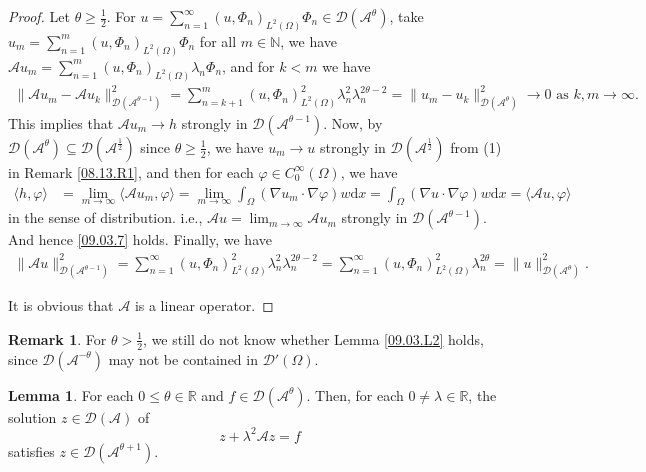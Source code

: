 \documentclass[preprint,12pt]{elsarticle}
\theoremstyle{definition}   %
\newtheorem{lemma}[theorem]{Lemma}
\newtheorem{remark}[theorem]{Remark}
\numberwithin{equation}{section}
\def\ra{\rightarrow}
\def\s{\subseteq}
\def\ms{\mathscr}
\def\vp{\varphi}
\def\lg{\langle}
\def\rg{\rangle}
\def\Om{\Omega}
\def\la{\lambda}
\def\iy{\infty}
\def\f{\frac}
\def\df{\mathrm d}
\def\mcA{\mathcal{A}}
\def\mcD{\mathcal{D}}
\newcommand{\R}{\mathbb R}
\newcommand{\N}{\mathbb N}
\begin{document}
\begin{proof}
	Let $\theta\geq \f{1}{2}$. For $u=\sum_{n=1}^\iy (u, \Phi_n)_{L^2(\Om)}\Phi_n\in \mcD(\mcA^\theta)$, take $u_m=\sum_{n=1}^m (u,\Phi_n)_{L^2(\Om)}\Phi_n$ for all $m\in\N$,   we have $\mcA u_m=\sum_{n=1}^m (u,\Phi_n)_{L^2(\Om)}\la_n \Phi_n$, and for $k< m$ we have 
	\begin{equation*}
		\begin{split} 
			\|\mcA u_m-\mcA u_k\|_{\mcD(\mcA^{\theta-1})}^2=\sum_{n=k+1}^m(u,\Phi_n)_{L^2(\Om)}^2\la_n^2 \la_n^{2\theta-2}= \|u_m-u_k\|_{\mcD(\mcA^\theta)}^2\ra 0 \mbox{ as } k,m\ra \iy. 
		\end{split} 
	\end{equation*}
	This implies that $\mcA u_m\ra h$ strongly in $\mcD(\mcA^{\theta-1})$. Now,  by $\mcD(\mcA^\theta)\s \mcD(\mcA^\f{1}{2})$ since $\theta\geq \f{1}{2}$, we have $u_m\ra u$ strongly in $\mcD(\mcA^\f{1}{2})$ from (1) in Remark \ref{08.13.R1}, and then  for each $\vp\in C_0^\iy(\Om)$, we have 
	\begin{equation*}
		\begin{split}
			\lg h, \vp\rg
			&=\lim_{m\ra\iy}\lg \mcA u_m, \vp\rg=\lim_{m\ra\iy}\int_\Om (\nabla u_m\cdot \nabla \vp)w\df x=\int_\Om (\nabla u\cdot\nabla\vp)w\df x=\lg \mcA u, \vp\rg 
		\end{split}
	\end{equation*}
	in the sense of distribution.  i.e., $\mcA u=\lim_{m\ra\iy}\mcA u_m$ strongly in $\mcD(\mcA^{\theta-1})$. And hence \eqref{09.03.7} holds. Finally, we have 
	\begin{equation*}
		\begin{split}
			\|\mcA u\|_{\mcD(\mcA^{\theta-1})}^2=\sum_{n=1}^\iy (u,\Phi_n)_{L^2(\Om)}^2\la_n^2\la_n^{2\theta-2}=\sum_{n=1}^\iy (u,\Phi_n)_{L^2(\Om)}^2\la_n^{2\theta}=\|u\|_{\mcD(\mcA^\theta)}^2. 
		\end{split}
	\end{equation*}
	
	
	It is obvious that $\mcA$ is a linear operator. 
\end{proof}

\begin{remark}\label{09.03.R1}
	For $\theta > \frac{1}{2}$, we still do not know whether Lemma \ref{09.03.L2} holds, since $\mathcal{D}(\mathcal{A}^{-\theta})$ may not be contained in $\ms{D}'(\Omega)$.
\end{remark}



\begin{lemma}\label{08.13.L3}
	For each  $0\leq \theta\in\R$ and $f\in \mcD(\mcA^\theta)$. Then, for each $0\neq\la\in\R$, the solution $z\in\mcD(\mcA)$ of 
	\begin{equation*}
		z+\la^2\mcA z=f
	\end{equation*}
	satisfies $z\in \mcD(\mcA^{\theta+1})$.
\end{lemma}
\end{document}
